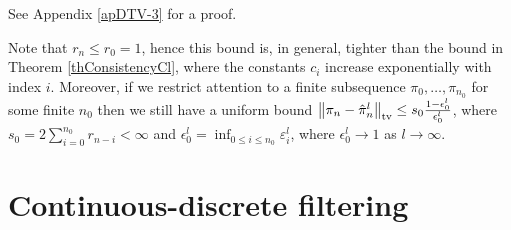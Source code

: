 \documentclass[onefignum,onetabnum]{siamonline250211}%
\begin{document}
See Appendix \ref{apDTV-3} for a proof. 

\begin{remark} \label{rmDTV-3}
Note that $r_n \le r_0 = 1$, hence this bound is, in general, tighter than the bound in Theorem \ref{thConsistencyCl}, where the constants $c_i$ increase exponentially with index $i$. Moreover, if we restrict attention to a finite subsequence $\pi_0, \ldots, \pi_{n_0}$ for some finite $n_0$ then we still have a uniform bound $\left\| \pi_n - \hat \pi_n^l \right\|_{\rm tv} \le s_0\frac{1-\epsilon_0^l}{\epsilon_0^l}$, where $s_0 = 2\sum_{i=0}^{n_0} r_{n-i} < \infty$ and $\epsilon_0^l = \inf_{0 \le i \le n_0} \varepsilon_i^l$, where $\epsilon_0^l \to 1$ as $l\to\infty$.
\end{remark}




%
\section{Continuous-discrete filtering} \label{sSDEs}


\end{document}
